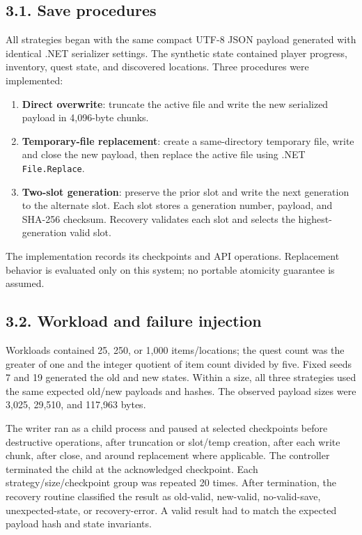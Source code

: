 \documentclass{jepcs}
\begin{document}
\subsection{3.1. Save procedures}
All strategies began with the same compact UTF-8 JSON payload generated with identical .NET serializer settings. The synthetic state contained player progress, inventory, quest state, and discovered locations. Three procedures were implemented:
\begin{enumerate}
\item \textbf{Direct overwrite}: truncate the active file and write the new serialized payload in 4,096-byte chunks.
\item \textbf{Temporary-file replacement}: create a same-directory temporary file, write and close the new payload, then replace the active file using .NET \texttt{File.Replace}.
\item \textbf{Two-slot generation}: preserve the prior slot and write the next generation to the alternate slot. Each slot stores a generation number, payload, and SHA-256 checksum. Recovery validates each slot and selects the highest-generation valid slot.
\end{enumerate}
The implementation records its checkpoints and API operations. Replacement behavior is evaluated only on this system; no portable atomicity guarantee is assumed.

\subsection{3.2. Workload and failure injection}
Workloads contained 25, 250, or 1,000 items/locations; the quest count was the greater of one and the integer quotient of item count divided by five. Fixed seeds 7 and 19 generated the old and new states. Within a size, all three strategies used the same expected old/new payloads and hashes. The observed payload sizes were 3,025, 29,510, and 117,963 bytes.

The writer ran as a child process and paused at selected checkpoints before destructive operations, after truncation or slot/temp creation, after each write chunk, after close, and around replacement where applicable. The controller terminated the child at the acknowledged checkpoint. Each strategy/size/checkpoint group was repeated 20 times. After termination, the recovery routine classified the result as old-valid, new-valid, no-valid-save, unexpected-state, or recovery-error. A valid result had to match the expected payload hash and state invariants.
\end{document}
